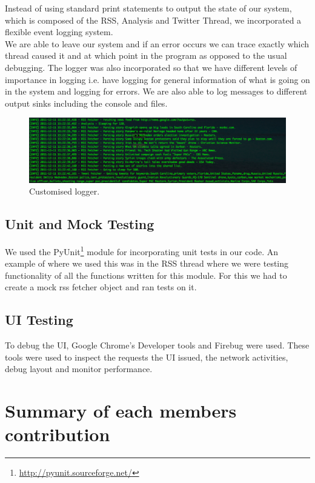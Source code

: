 \documentclass{report}
\begin{document}
			  Instead of using standard print statements to output the state of our system, which is composed of the RSS, Analysis and Twitter Thread, we incorporated a flexible event logging system.\\
			We are able to leave our system and if an error occurs we can trace exactly which thread caused it and at which point in the program as opposed to the usual debugging.
		  The logger was also incorporated so that we have different levels of importance in logging i.e. have logging for general information of what is going on in the system and logging for errors. We are also able to log messages to different output sinks including the console and files.

				\begin{figure}
				 \includegraphics[scale=0.32]{logger.png}
				 \caption{\label{fig:logger} Customised logger.}
				\end{figure}
				
		   \subsection{Unit and Mock Testing}

		  	  We used the PyUnit\footnote{\url{http://pyunit.sourceforge.net/}} module for incorporating unit tests in our code. An example of where we used this was in the RSS thread where we were testing functionality of all the functions written for this module. For this we had to create a mock rss fetcher object and ran tests on it.

				\subsection{UI Testing}
				To debug the UI, Google Chrome’s Developer tools and Firebug were used. These tools were used to inspect the requests the UI issued, the network activities, debug layout and monitor performance.
	
		\section{Summary of each members contribution}
		
\end{document}
